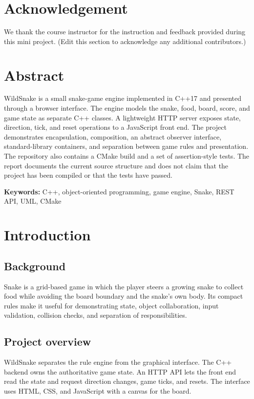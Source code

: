 \documentclass[12pt,a4paper]{report}
\begin{document}
\chapter*{Acknowledgement}
We thank the course instructor for the instruction and feedback provided
during this mini project. (Edit this section to acknowledge any additional
contributors.)

\chapter*{Abstract}
WildSnake is a small snake-game engine implemented in C++17 and presented
through a browser interface. The engine models the snake, food, board, score,
and game state as separate C++ classes. A lightweight HTTP server exposes
state, direction, tick, and reset operations to a JavaScript front end. The
project demonstrates encapsulation, composition, an abstract observer
interface, standard-library containers, and separation between game rules and
presentation. The repository also contains a CMake build and a set of
assertion-style tests. The report documents the current source structure and
does not claim that the project has been compiled or that the tests have passed.

\textbf{Keywords:} C++, object-oriented programming, game engine, Snake, REST API,
UML, CMake

\tableofcontents
\listoffigures
\listoftables
\clearpage
{}

\chapter{Introduction}
\section{Background}
Snake is a grid-based game in which the player steers a growing snake to collect
food while avoiding the board boundary and the snake's own body. Its compact
rules make it useful for demonstrating state, object collaboration, input
validation, collision checks, and separation of responsibilities.

\section{Project overview}
WildSnake separates the rule engine from the graphical interface. The C++
backend owns the authoritative game state. An HTTP API lets the front end read
the state and request direction changes, game ticks, and resets. The interface
uses HTML, CSS, and JavaScript with a canvas for the board.
\end{document}
